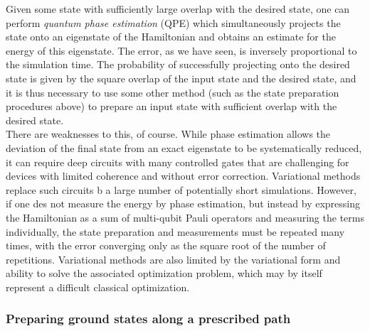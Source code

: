 \documentclass{book}
\theoremstyle{definition}
\begin{document}
Given some state with sufficiently large overlap with the desired state, one can perform \textit{quantum phase estimation} (QPE) which simultaneously projects the state onto an eigenstate of the Hamiltonian and obtains an estimate for the energy of this eigenstate. The error, as we have seen, is inversely proportional to the simulation time. The probability of successfully projecting onto the desired state is given by the square overlap of the input state and
the desired state, and it is thus necessary to use some other
method (such as the state preparation procedures above) to
prepare an input state with sufficient overlap with the desired
state.\\


There are weaknesses to this, of course. While phase estimation allows the deviation of the final state from an exact eigenstate to be systematically reduced, it can require deep circuits with many controlled gates that are challenging for devices with limited coherence and without error correction. Variational methods replace such circuits b a large number of potentially short simulations. However, if one des not measure the energy by phase estimation, but instead by expressing the Hamiltonian as a sum of multi-qubit Pauli operators and measuring the terms individually, the state preparation and measurements must be repeated many times, with the error converging only as the square root of the number of repetitions. Variational methods are also limited by the variational form and ability to solve the associated optimization
problem, which may by itself represent a difficult classical
optimization.


\subsubsection{Preparing ground states along a prescribed path}
\end{document}
